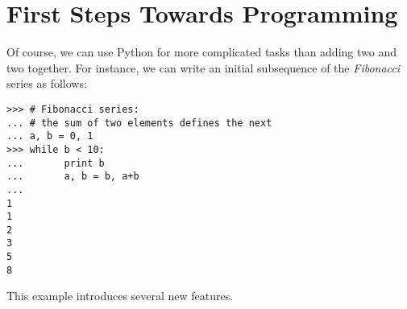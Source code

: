 \documentclass{manual}
\begin{document}
\section{First Steps Towards Programming \label{firstSteps}}

Of course, we can use Python for more complicated tasks than adding
two and two together.  For instance, we can write an initial
subsequence of the \emph{Fibonacci} series as follows:

\begin{verbatim}
>>> # Fibonacci series:
... # the sum of two elements defines the next
... a, b = 0, 1
>>> while b < 10:
...       print b
...       a, b = b, a+b
... 
1
1
2
3
5
8
\end{verbatim}

This example introduces several new features.
\end{document}
